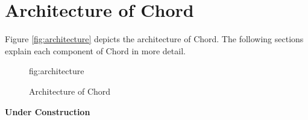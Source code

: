 \chapter{Architecture of Chord}
\label{chap:architecture}

Figure \ref{fig:architecture} depicts the architecture of Chord.  The following sections explain each component of Chord in more detail.

\begin{figure}
\begin{center}
\begin{label}{fig:architecture}
\caption{Architecture of Chord}
\end{label}
\end{center}
\end{figure}

{\bf Under Construction}

%

